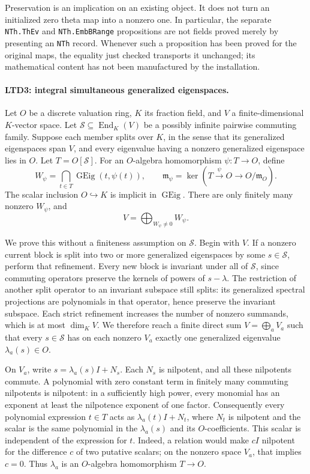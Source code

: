 Preservation is an implication on an existing object.  It does not
turn an initialized zero theta map into a nonzero one.  In particular,
the separate \texttt{NTh.ThEv} and \texttt{NTh.EmbBRange}
propositions are not fields proved merely by presenting an
\texttt{NTh} record.  Whenever such a proposition has been proved
for the original maps, the equality just checked transports it
unchanged; its mathematical content has not been manufactured by
the installation.

\paragraph{LTD3: integral simultaneous generalized eigenspaces.}
\label{claim:LTD3}
Let \(O\) be a discrete valuation ring, \(K\) its fraction field,
and \(V\) a finite-dimensional \(K\)-vector space.  Let
\(\mathcal S\subseteq\operatorname{End}_K(V)\) be a possibly
infinite pairwise commuting family.  Suppose each member splits
over \(K\), in the sense that its generalized eigenspaces span
\(V\), and every eigenvalue having a nonzero generalized
eigenspace lies in \(O\).  Let \(T=O[\mathcal S]\).  For an
\(O\)-algebra homomorphism \(\psi:T\to O\), define
\[
 W_\psi=\bigcap_{t\in T}\operatorname{GEig}(t,\psi(t)),
 \qquad
 \mathfrak m_\psi=\ker(T\xrightarrow{\psi}O\longrightarrow O/\mathfrak m_O).
 \tag{LTD.5}
\]
The scalar inclusion \(O\hookrightarrow K\) is implicit in
\(\operatorname{GEig}\).  There are only finitely many nonzero
\(W_\psi\), and
\[
                     V=\bigoplus_{W_\psi\ne0}W_\psi.             \tag{LTD.6}
\]

We prove this without a finiteness assumption on \(\mathcal S\).
Begin with \(V\).  If a nonzero current block is split into two
or more generalized eigenspaces by some \(s\in\mathcal S\),
perform that refinement.  Every new block is invariant under
all of \(\mathcal S\), since commuting operators preserve the
kernels of powers of \(s-\lambda\).  The restriction of another
split operator to an invariant subspace still splits: its
generalized spectral projections are polynomials in that
operator, hence preserve the invariant subspace.  Each strict
refinement increases the number of nonzero summands, which is
at most \(\dim_KV\).  We therefore reach a finite direct sum
\(V=\bigoplus_aV_a\) such that every \(s\in\mathcal S\) has on
each nonzero \(V_a\) exactly one generalized eigenvalue
\(\lambda_a(s)\in O\).

On \(V_a\), write \(s=\lambda_a(s)I+N_s\).  Each \(N_s\)
is nilpotent, and all these nilpotents commute.  A polynomial
with zero constant term in finitely many commuting nilpotents
is nilpotent: in a sufficiently high power, every monomial has
an exponent at least the nilpotence exponent of one factor.
Consequently every polynomial expression \(t\in T\) acts as
\(\lambda_a(t)I+N_t\), where \(N_t\) is nilpotent and the scalar
is the same polynomial in the \(\lambda_a(s)\) and its
\(O\)-coefficients.  This scalar is independent of the expression
for \(t\).  Indeed, a relation would make \(cI\) nilpotent for
the difference \(c\) of two putative scalars; on the nonzero
space \(V_a\), that implies \(c=0\).  Thus \(\lambda_a\) is an
\(O\)-algebra homomorphism \(T\to O\).

